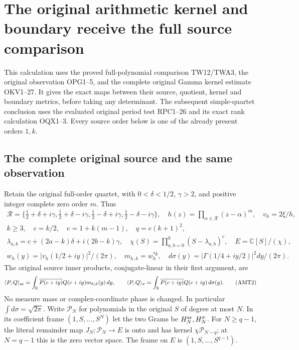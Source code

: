 \documentclass[11pt,a4paper]{article}
\begin{document}

\clearpage
\section{The original arithmetic kernel and boundary receive the full source comparison}
\label{sec:AMT}

This calculation uses the proved full-polynomial comparison TW12/TWA3,
the original observation OPG1--5, and the complete original Gamma
kernel estimate OKV1--27. It gives the exact maps between their source,
quotient, kernel and boundary metrics, before taking any determinant.
The subsequent simple-quartet conclusion uses the evaluated original
period test RPC1--26 and its exact rank calculation OQX1--3. Every
source order below is one of the already present orders $1,k$.

\subsection{The complete original source and the same observation}
Retain the original full-order quartet, with $0<\delta<1/2$,
$\gamma>2$, and positive integer complete zero order $m$. Thus
\[
\begin{gathered}
 \mathcal R=\{\tfrac12+\delta+i\gamma,\tfrac12+\delta-i\gamma,
              \tfrac12-\delta+i\gamma,\tfrac12-\delta-i\gamma\},\quad
 h(z)=\prod_{\alpha\in\mathcal R}(z-\alpha)^m,\quad v_h=2\xi/h,\\
 k\ge3,\quad c=k/2,\quad e=1+k(m-1),\quad q=e(k+1)^2,\\
 \lambda_{a,b}=c+(2a-k)\delta+i(2b-k)\gamma,\quad
 \chi(S)=\prod_{a,b=0}^k(S-\lambda_{a,b})^e,\quad E=\mathbb C[S]/(\chi),\\
 w_h(y)=|v_h(1/2+iy)|^2/(2\pi),\quad m_{h,k}=w_h^{*k},\quad
 d\sigma(y)=|\Gamma(1/4+iy/2)|^2dy/(2\pi).
\end{gathered}\tag{AMT1}
\]
The original source inner products, conjugate-linear in their first
argument, are
\[
 \langle P,Q\rangle_{\rm ar}
  =\int_{\mathbb R}\overline{P(c+iy)}Q(c+iy)m_{h,k}(y)\,dy,
 \qquad
 \langle P,Q\rangle_\sigma
  =\int_{\mathbb R}\overline{P(c+iy)}Q(c+iy)\,d\sigma(y).
 \tag{AMT2}
\]
No measure mass or complex-coordinate phase is changed. In particular
$\int d\sigma=\sqrt{2\pi}$. Write $\mathcal P_N$ for polynomials
in the original $S$ of degree at most $N$. In its coefficient frame
$(1,S,\ldots,S^N)$ let the two Grams be $H_N^{\rm ar},H_N^\sigma$.
For $N\ge q-1$, the literal remainder map
$J_N:\mathcal P_N\to E$ is onto and has kernel
$\chi\mathcal P_{N-q}$; at $N=q-1$ this is the zero vector space.
The frame on $E$ is $(1,S,\ldots,S^{q-1})$.
\end{document}
